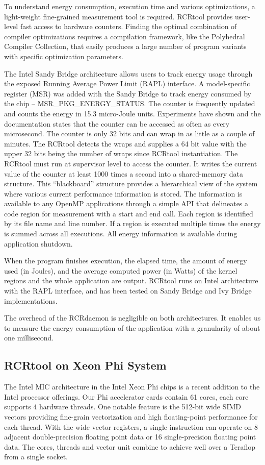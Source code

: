 To understand energy consumption, execution time and various optimizations,
a light-weight fine-grained measurement tool is required. RCRtool provides 
user-level fast access to hardware counters.
Finding the optimal combination of compiler optimizations 
requires a compilation framework, like the Polyhedral Compiler
Collection, that easily produces a large number of 
program variants with specific optimization parameters.

The Intel Sandy Bridge architecture allows users to track energy usage through 
the exposed Running Average Power Limit (RAPL) interface\cite{IntelSystemProgrammingVol3}. 
A model-specific register (MSR) was added with the Sandy Bridge to track energy
consumed by the chip  -- MSR\_PKG\_ENERGY\_STATUS.
The counter is frequently updated and counts the energy in 15.3 micro-Joule units.
Experiments have shown\cite{us} and the documentation\cite{IntelSystemProgrammingVol3} states
that the counter can be accessed as often as every microsecond. 
The counter is only 32 bits and can wrap in as little as a couple of minutes.
The RCRtool detects the wraps and supplies a 64 bit value with the 
upper 32 bits being the number of wraps since RCRtool instantiation.
The RCRtool must run at supervisor level to access the counter.
It writes the current value of the counter at least 1000 times a second into a shared-memory
data structure. This ``blackboard'' structure provides a hierarchical view of the system
where various current performance information is stored. The 
information is available to any OpenMP applications through a simple API that 
delineates a code region for measurement with a start and end call.
Each region is identified by its file name and line number.
If a region is executed multiple times the energy is summed across all executions. 
All energy information is available during application shutdown.

When the program finishes execution,
the elapsed time, the amount of energy used (in Joules), and the average computed
power (in Watts) of the kernel regions and the whole application are output. 
RCRtool runs on Intel architecture with the RAPL interface, and has been tested
on Sandy Bridge and Ivy Bridge implementations.

The overhead of the RCRdaemon is negligible on both architectures.  
It enables us to measure the energy consumption of the application 
with a granularity of about one millisecond. 

\subsection{RCRtool on Xeon Phi System}
The Intel MIC architecture in the Intel Xeon Phi chips is a recent addition to the
Intel processor offerings.
Our Phi accelerator cards contain 61 cores, each core supports 4 hardware threads. 
One notable feature is the 512-bit wide SIMD vectors providing fine-grain
vectorization and high floating-point performance for each thread.
With the wide vector registers, a single 
instruction can operate on 8 adjacent double-precision floating point data or 16 
single-precision floating point data. The cores, threads and vector unit combine
to achieve well over a Teraflop from a single socket.

